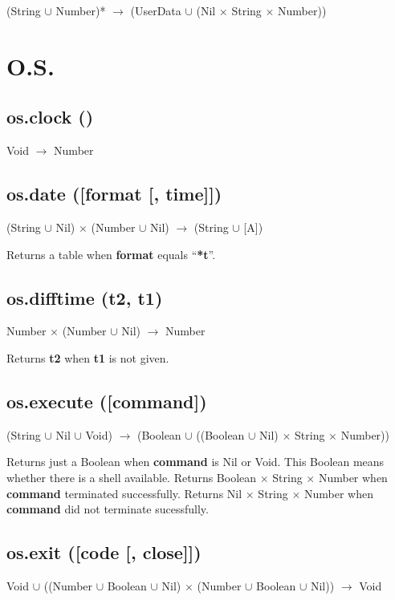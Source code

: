 \documentclass[12pt]{article}
\begin{document}
(String $\cup$ Number)* $\rightarrow$
(UserData $\cup$ (Nil $\times$ String $\times$ Number))

\newpage

\section{O.S.}

\subsection{os.clock ()}

Void $\rightarrow$ Number

\subsection{os.date ([format [, time]])}

(String $\cup$ Nil) $\times$
(Number $\cup$ Nil) $\rightarrow$
(String $\cup$ [A])

Returns a table when \textbf{format} equals ``\textbf{*t}''.

\subsection{os.difftime (t2, t1)}

Number $\times$ (Number $\cup$ Nil) $\rightarrow$
Number

Returns \textbf{t2} when \textbf{t1} is not given.

\subsection{os.execute ([command])}

(String $\cup$ Nil $\cup$ Void) $\rightarrow$
(Boolean $\cup$ ((Boolean $\cup$ Nil) $\times$ String $\times$ Number))

Returns just a Boolean when \textbf{command} is Nil or Void.
This Boolean means whether there is a shell available.
Returns Boolean $\times$ String $\times$ Number when \textbf{command}
terminated successfully.
Returns Nil $\times$ String $\times$ Number when \textbf{command}
did not terminate sucessfully.

\subsection{os.exit ([code [, close]])}

Void $\cup$
((Number $\cup$ Boolean $\cup$ Nil) $\times$
(Number $\cup$ Boolean $\cup$ Nil)) $\rightarrow$
Void
\end{document}
